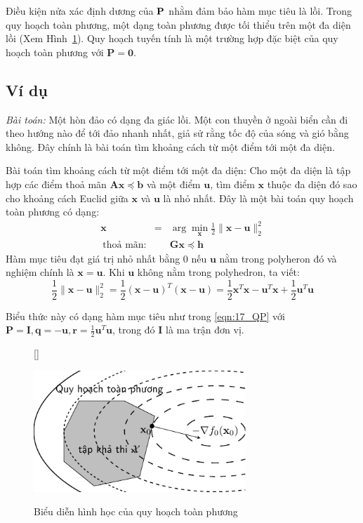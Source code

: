 Điều kiện nửa xác định dương của $\mathbf{P}$ nhằm đảm bảo hàm mục tiêu là lồi.
Trong quy hoạch toàn phương, một dạng toàn phương được tối thiểu trên một đa diện lồi (Xem
Hình~\ref{fig:17_qp}). Quy hoạch tuyến tính là một trường hợp đặc biệt của quy hoạch toàn phương với
$\mathbf{P} = \mathbf{0}$.



\subsection{Ví dụ}
\textit{Bài toán:} Một hòn đảo có dạng đa giác
lồi. Một con thuyền ở ngoài biển cần đi theo hướng nào để tới đảo nhanh
nhất, giả sử rằng tốc độ của sóng và gió bằng không. Đây chính là bài toán tìm khoảng cách từ
một điểm tới một đa diện.

Bài toán tìm khoảng cách từ một điểm tới một đa diện: Cho
một đa diện là tập hợp các điểm thoả mãn $\mathbf{Ax} \preceq \mathbf{b}$ và
một điểm $\mathbf{u}$, tìm điểm $\mathbf{x}$ thuộc đa diện đó sao cho khoảng
cách Euclid giữa $\mathbf{x}$ và $\mathbf{u}$ là nhỏ nhất. Đây là một bài
toán quy hoạch toàn phương có dạng:
\begin{eqnarray*}
\mathbf{x} &=& \arg\min_{\mathbf{x}} \frac{1}{2}\|\mathbf{x} - \mathbf{u}\|_2^2 \\\
\text{thoả mãn:} &&\mathbf{Gx} \preceq \mathbf{h}
\end{eqnarray*}
Hàm mục tiêu đạt giá trị nhỏ nhất bằng 0 nếu $\mathbf{u}$ nằm trong polyheron đó
và nghiệm chính là $\mathbf{x} = \mathbf{u}$. Khi $\mathbf{u}$ không nằm trong
polyhedron, ta viết:
\begin{equation*}
\frac{1}{2} \|\mathbf{x} - \mathbf{u}\|_2^2 = \frac{1}{2} (\mathbf{x} - \mathbf{u})^T(\mathbf{x} - \mathbf{u}) = \frac{1}{2} \mathbf{x}^T\mathbf{x} - \mathbf{u}^T\mathbf{x} + \frac{1}{2} \mathbf{u}^T\mathbf{u}
\end{equation*}

Biểu thức này có dạng hàm mục tiêu như trong \eqref{eqn:17_QP} với $\mathbf{P = I}, \mathbf{q} = - \mathbf{u}, \mathbf{r} = \frac{1}{2} \mathbf{u}^T\mathbf{u}$, trong đó $\mathbf{I}$ là ma trận đơn vị.

\begin{figure}[t]
[\FBwidth]
{\caption{Biểu diễn hình học của quy hoạch toàn phương}
\label{fig:17_qp}}
{\includegraphics[width=8cm]{Chapters/08_ConvexOptimization/17_convexopt/latex/qp.pdf}}
\end{figure}

